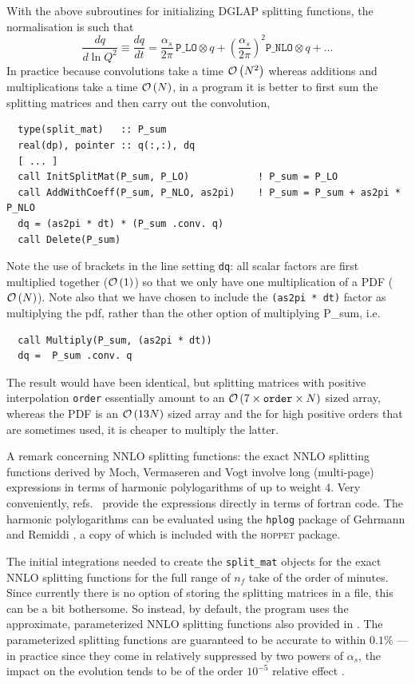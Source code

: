 \documentclass[12pt]{article}
\newcommand{\as}{\alpha_s}
\newcommand{\ie}{i.e.\ }
\newcommand{\hoppet}{\textsc{hoppet}\xspace}
\newcommand{\ttt}[1]{\texttt{#1}}
\newcommand{\order}[1]{{\cal O}\left(#1\right)}
\begin{document}
With the above subroutines for initializing DGLAP splitting functions,
the normalisation is such that 
\begin{equation}
  \label{eq:dpdf}
  \frac{dq}{d\ln Q^2} \equiv \frac{dq}{dt} = \frac{\as}{2\pi}\,
  \ttt{P\_LO} \otimes q +  
                        \left(\frac{\as}{2\pi}\right)^2 \ttt{P\_NLO}
                        \otimes q + \ldots
\end{equation}
In practice because convolutions take a time $\order{N^2}$ whereas
additions and multiplications take a time $\order{N}$, in a program it
is better to first sum the splitting matrices and then carry out the
convolution,
\begin{verbatim}
  type(split_mat)   :: P_sum
  real(dp), pointer :: q(:,:), dq
  [ ... ]
  call InitSplitMat(P_sum, P_LO)            ! P_sum = P_LO
  call AddWithCoeff(P_sum, P_NLO, as2pi)    ! P_sum = P_sum + as2pi * P_NLO
  dq = (as2pi * dt) * (P_sum .conv. q)
  call Delete(P_sum)
\end{verbatim}
Note the use of brackets in the line setting \ttt{dq}: all scalar
factors are first multiplied together ($\order{1}$) so that we only
have one multiplication of a PDF ($\order{N}$). Note also that we have
chosen to include the \ttt{(as2pi * dt)} factor as multiplying the
pdf, rather than the other option of multiplying {P\_sum}, \ie 
\begin{verbatim}
  call Multiply(P_sum, (as2pi * dt))
  dq =  P_sum .conv. q
\end{verbatim}
The result would have been identical, but splitting matrices with
positive interpolation \ttt{order} essentially amount to an
$\order{7\times \ttt{order} \times N}$ sized array, whereas the PDF is
an $\order{13 N}$ sized array and the for high positive orders that
are sometimes used, it is cheaper to multiply the latter.

A remark concerning NNLO splitting functions: the exact NNLO splitting
functions derived by Moch, Vermaseren and Vogt
\cite{NNLO-NS,NNLO-singlet} involve long (multi-page) expressions in
terms of harmonic polylogarithms of up to weight 4. Very conveniently,
refs.~\cite{NNLO-NS,NNLO-singlet} provide the expressions directly in
terms of fortran code.
%
The harmonic polylogarithms can be evaluated using the \ttt{hplog}
package of Gehrmann and Remiddi \cite{FortranPolyLog}, a copy of which
is included with the \hoppet package. 

The initial integrations needed to create the \ttt{split\_mat} objects
for the exact NNLO splitting functions for the full range of $n_f$
take of the order of minutes.  Since currently there is no option of
storing the splitting matrices in a file, this can be a bit
bothersome. So instead, by default, the program uses the approximate,
parameterized NNLO splitting functions also provided in
\cite{NNLO-NS,NNLO-singlet}. The parameterized splitting functions are
guaranteed to be accurate to within $0.1\%$ --- in practice since they
come in relatively suppressed by two powers of $\as$, the impact on
the evolution tends to be of the order $10^{-5}$ relative effect
\cite{Benchmarks}.
\end{document}
